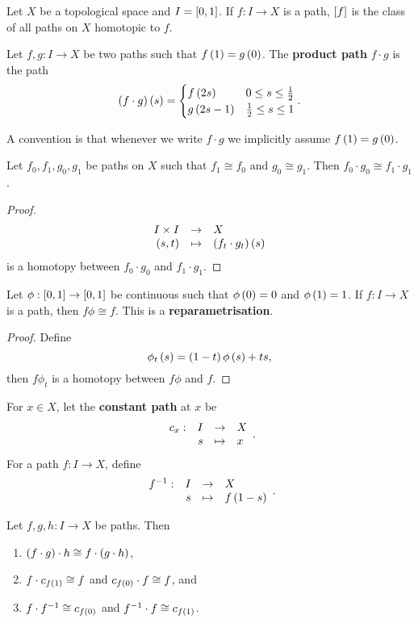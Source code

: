 
Let $ X $ be a topological space and $ I = \sb{0, 1} $. If $ f : I \to X $ is a path, $ \sb{f} $ is the class of all paths on $ X $ homotopic to $ f $.

\begin{definition*}
Let $ f, g : I \to X $ be two paths such that $ f\rb{1} = g\rb{0} $. The \textbf{product path} $ f \cdot g $ is the path
$$ \rb{f \cdot g}\rb{s} =
\begin{cases}
f\rb{2s} & 0 \le s \le \tfrac{1}{2} \\
g\rb{2s - 1} & \tfrac{1}{2} \le s \le 1
\end{cases}.
$$
\end{definition*}

A convention is that whenever we write $ f \cdot g $ we implicitly assume $ f\rb{1} = g\rb{0} $.

\begin{lemma}
\label{lem:1.2}
Let $ f_0, f_1, g_0, g_1 $ be paths on $ X $ such that $ f_1 \cong f_0 $ and $ g_0 \cong g_1 $. Then $ f_0 \cdot g_0 \cong f_1 \cdot g_1 $.
\end{lemma}

\begin{proof}
$$ \function{I \times I}{X}{\rb{s, t}}{\rb{f_t \cdot g_t}\rb{s}} $$
is a homotopy between $ f_0 \cdot g_0 $ and $ f_1 \cdot g_1 $.
\end{proof}

\begin{remark*}
Let $ \phi : \sb{0, 1} \to \sb{0, 1} $ be continuous such that $ \phi\rb{0} = 0 $ and $ \phi\rb{1} = 1 $. If $ f : I \to X $ is a path, then $ f\phi \cong f $. This is a \textbf{reparametrisation}.
\end{remark*}

\begin{proof}
Define
$$ \phi_t\rb{s} = \rb{1 - t}\phi\rb{s} + ts, $$
then $ f\phi_t $ is a homotopy between $ f\phi $ and $ f $.
\end{proof}

For $ x \in X $, let the \textbf{constant path} at $ x $ be
$$ \function[c_x]{I}{X}{s}{x}. $$
For a path $ f : I \to X $, define
$$ \function[f^{-1}]{I}{X}{s}{f\rb{1 - s}}. $$

\begin{lemma}
\label{lem:1.3}
Let $ f, g, h : I \to X $ be paths. Then
\begin{enumerate}
\item $ \rb{f \cdot g} \cdot h \cong f \cdot \rb{g \cdot h} $,
\item $ f \cdot c_{f\rb{1}} \cong f $ and $ c_{f\rb{0}} \cdot f \cong f $, and
\item $ f \cdot f^{-1} \cong c_{f\rb{0}} $ and $ f^{-1} \cdot f \cong c_{f\rb{1}} $.
\end{enumerate}
\end{lemma}

